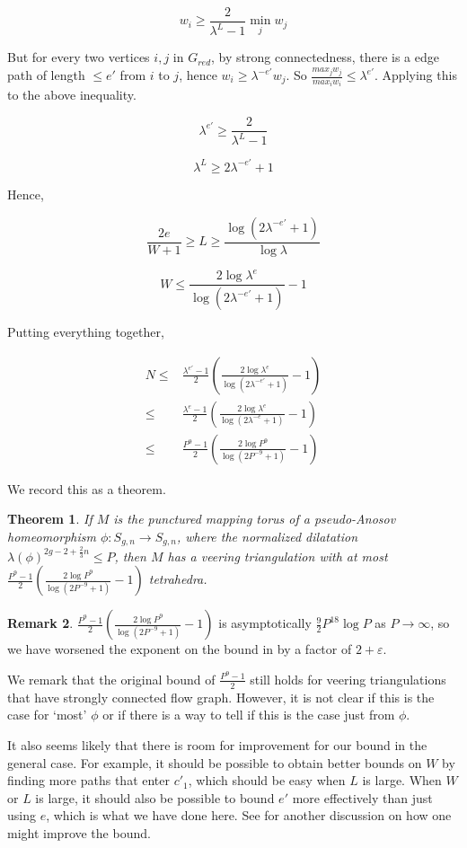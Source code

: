 \documentclass[12pt]{amsart}
\newtheorem{thm}{Theorem}[section]
\theoremstyle{definition}
\newtheorem{rmk}[thm]{Remark}
\numberwithin{equation}{section}
\renewcommand{\epsilon}{\varepsilon}
\begin{document}
$$w_i \geq \frac{2}{\lambda^L-1} \min_j w_j$$

But for every two vertices $i,j$ in $G_{red}$, by strong connectedness, there is a edge path of length $\leq e'$ from $i$ to $j$, hence $w_i \geq \lambda^{-e'} w_j$. So $\frac{max_j w_j}{max_i w_i} \leq \lambda^{e'}$. Applying this to the above inequality.

$$ \lambda^{e'} \geq \frac{2}{\lambda^L-1} $$

$$ \lambda^L \geq 2 \lambda^{-e'}+1 $$

Hence,

$$ \frac{2e}{W+1} \geq L \geq \frac{\log(2 \lambda^{-e'}+1)}{\log \lambda} $$

$$ W \leq \frac{2 \log \lambda^e}{\log(2 \lambda^{-e'}+1)} -1 $$

Putting everything together, 

\begin{align*}
N \leq& \frac{\lambda^{e'}-1}{2} (\frac{2 \log \lambda^e}{\log(2 \lambda^{-e'}+1)}-1)\\
\leq& \frac{\lambda^e-1}{2} (\frac{2 \log \lambda^e}{\log(2 \lambda^{-e}+1)}-1)\\
\leq& \frac{P^9-1}{2} (\frac{2 \log P^9}{\log(2 P^{-9}+1)}-1)
\end{align*}

We record this as a theorem.

\begin{thm} \label{thm:boundveertet}
If $M$ is the punctured mapping torus of a pseudo-Anosov homeomorphism $\phi: S_{g,n} \to S_{g,n}$, where the normalized dilatation $\lambda(\phi)^{2g-2+\frac{2}{3}n} \leq P$, then $M$ has a veering triangulation with at most $\frac{P^9-1}{2} (\frac{2 \log P^9}{\log(2 P^{-9}+1)}-1)$ tetrahedra.
\end{thm}

\begin{rmk} \label{rmk:boundcompare}
$\frac{P^9-1}{2} (\frac{2 \log P^9}{\log(2 P^{-9}+1)}-1)$ is asymptotically $\frac{9}{2} P^{18}\log P$ as $P \to \infty$, so we have worsened the exponent on the bound in \cite[Theorem 6.2]{Ago11} by a factor of $2+\epsilon$. 

We remark that the original bound of $\frac{P^9-1}{2}$ still holds for veering triangulations that have strongly connected flow graph. However, it is not clear if this is the case for `most' $\phi$ or if there is a way to tell if this is the case just from $\phi$.

It also seems likely that there is room for improvement for our bound in the general case. For example, it should be possible to obtain better bounds on $W$ by finding more paths that enter $c'_1$, which should be easy when $L$ is large. When $W$ or $L$ is large, it should also be possible to bound $e'$ more effectively than just using $e$, which is what we have done here. See  for another discussion on how one might improve the bound.
\end{rmk}
\end{document}

